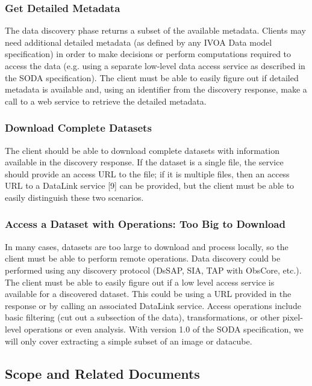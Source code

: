 \documentclass[11pt,a4paper]{ivoa}
\begin{document}
\subsubsection{Get Detailed Metadata}
The data discovery phase returns a subset of the available metadata.  Clients may need additional detailed metadata (as defined by any IVOA Data model specification) in order to make decisions or perform computations required to access the data (e.g. using a separate low-level data access service as described in the SODA specification). The client must be able to easily figure out if detailed metadata is available and, using an identifier from the discovery response, make a call to a web service to retrieve the detailed metadata.

\subsubsection{Download Complete Datasets}
\label{sec:sync}

The client should be able to download complete datasets with information available in the discovery response. If the dataset is a single file, the service should provide an access URL to the file; if it is multiple files, then an access URL to a DataLink service [9] can be provided, but the client must be able to easily distinguish these two scenarios.

\subsubsection{Access a Dataset with Operations: Too Big to Download}
\label{sec:async}
In many cases, datasets are too large to download and process locally, so the client must be able to perform remote operations.
Data discovery could be performed using any discovery protocol (DsSAP, SIA, TAP with ObsCore, etc.).
The client must be able to easily figure out if a low level access service is available for a discovered dataset. 
This could be using a URL provided in the response or by calling an associated DataLink service.
Access operations include basic filtering (cut out a subsection of the data), transformations, 
or other pixel-level operations or even analysis. With version 1.0 of the SODA  specification, we will only cover
extracting a simple subset of an image or datacube. 

\subsection{Scope and Related Documents}
\label{sec:examples}
\end{document}
